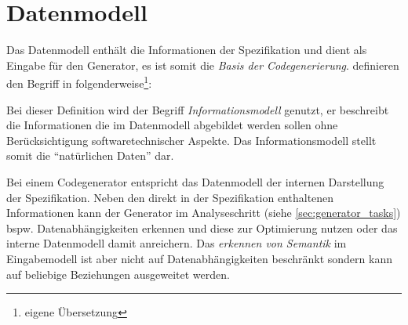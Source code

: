 \section{Datenmodell}
\label{sec:datamodel}

Das Datenmodell enthält die Informationen der Spezifikation und dient als Eingabe für den Generator, es ist somit die \emph{Basis der Codegenerierung}. \citeauthor{rfc3198} definieren den Begriff in \cite{rfc3198} folgenderweise\footnote{eigene Übersetzung}:


Bei dieser Definition wird der Begriff \emph{Informationsmodell} genutzt, er beschreibt die Informationen die im Datenmodell abgebildet werden sollen ohne Berücksichtigung softwaretechnischer Aspekte. Das Informationsmodell stellt somit die \enquote{natürlichen Daten} dar.

Bei einem Codegenerator entspricht das Datenmodell der internen Darstellung der Spezifikation. Neben den direkt in der Spezifikation enthaltenen Informationen kann der Generator im Analyseschritt (siehe \cref{sec:generator_tasks}) bspw. Datenabhängigkeiten erkennen und diese zur Optimierung nutzen oder das interne Datenmodell damit anreichern. Das \emph{erkennen von Semantik} im Eingabemodell ist aber nicht auf Datenabhängigkeiten beschränkt sondern kann auf beliebige Beziehungen ausgeweitet werden. 


